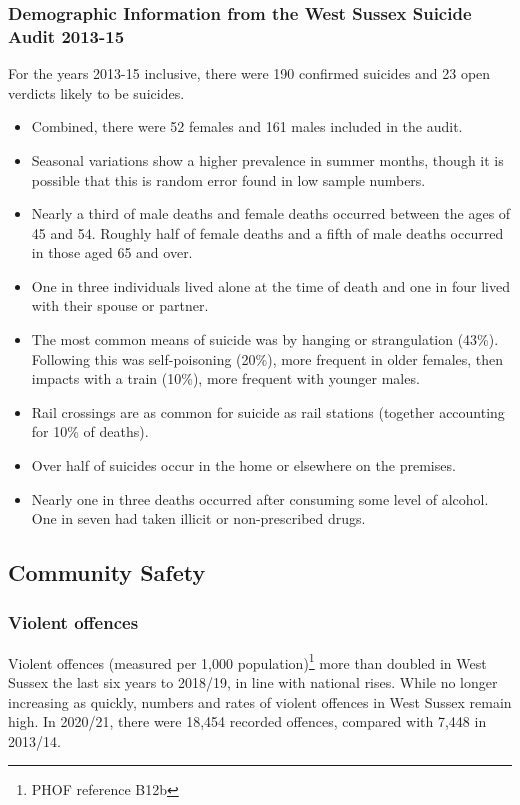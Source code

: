 \subsubsection{Demographic Information from the West Sussex Suicide Audit 2013-15} For the years 2013-15 inclusive, there were 190 confirmed suicides and 23 open verdicts likely to be suicides.
\begin{itemize}[noitemsep]
    \item Combined, there were 52 females and 161 males included in the audit.
    \item Seasonal variations show a higher prevalence in summer months, though it is possible that this is random error found in low sample numbers.
    \item Nearly a third of male deaths and female deaths occurred between the ages of 45 and 54. Roughly half of female deaths and a fifth of male deaths occurred in those aged 65 and over.
    \item One in three individuals lived alone at the time of death and one in four lived with their spouse or partner.
    \item The most common means of suicide was by hanging or strangulation (43\%). Following this was self-poisoning (20\%), more frequent in older females, then impacts with a train (10\%), more frequent with younger males.
    \item Rail crossings are as common for suicide as rail stations (together accounting for 10\% of deaths).
    \item Over half of suicides occur in the home or elsewhere on the premises.
    \item Nearly one in three deaths occurred after consuming some level of alcohol. One in seven had taken illicit or non-prescribed drugs.
\end{itemize}

\subsection{Community Safety}
\subsubsection{Violent offences} Violent offences (measured per 1,000 population)\footnote{PHOF reference B12b}  more than doubled in West Sussex the last six years to 2018/19, in line with national rises. While no longer increasing as quickly, numbers and rates of violent offences in West Sussex remain high. In 2020/21, there were 18,454 recorded offences, compared with 7,448 in 2013/14.

